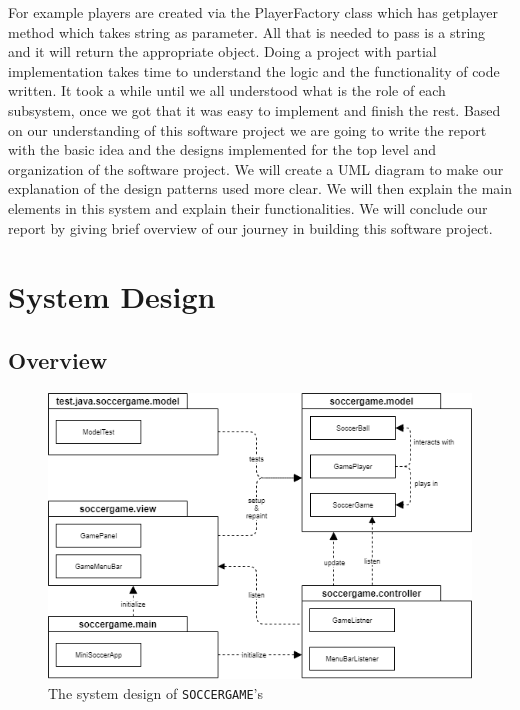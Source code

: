 \documentclass[12pt, dvipsnames, a4paper]{article}
\newcommand{\code}[1]{\texttt{#1}}
\begin{document}
For example players are created via the PlayerFactory class which has getplayer method
which takes string as parameter. All that is needed to pass is a string and it will
return the appropriate object. Doing a project with partial implementation takes time
to understand the logic and the functionality of code written. It took a while until
we all understood what is the role of each subsystem, once we got that it was easy to
implement and finish the rest. Based on our understanding of this software project we
are going to write the report with the basic idea and the designs implemented for the
top level and organization of the software project. We will create a UML diagram to make
our explanation of the design patterns used more clear. We will then explain the main
elements in this system and explain their functionalities. We will conclude our report
by giving brief overview of our journey in building this software project.

\section{System Design}
\subsection{Overview}
\begin{center}
	\begin{figure}[H]
		\hspace{20pt}
		\includegraphics[scale=.9]{diagrams/system-diagram/system-diagram-pkg.png}
		\caption{The system design of \code{SOCCERGAME}'s}
		\label{fig:systemdeisgn}
	\end{figure}
\end{center}
\clearpage
\end{document}
